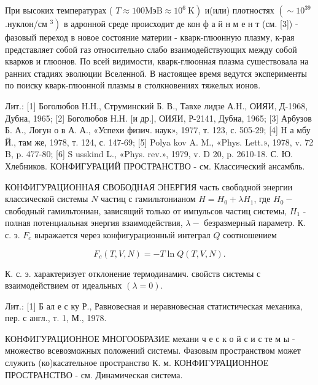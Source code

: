 \documentclass[10pt]{article}
\begin{document}
При высоких температурах ( $\left.T \approx 100 \mathrm{MэB} \approx 10^{6} \mathrm{~K}\right)$ и(или) плотностях $\left(\sim 10^{39}\right.$.нуклон/см $\left.{ }^{3}\right)$ в адронной среде происходит де кон ф а й н м е н т (см. [3]) - фазовый переход в новое состояние материи - кварк-глюонную плазму, к-рая представляет собой газ относительно слабо взаимодействующих между собой кварков и глюонов. По всей видимости, кварк-глюонная плазма сушествовала на ранних стадиях эволюции Вселенной. В настоящее время ведутся эксперименты по поиску кварк-глюонной плазмы в столкновениях тяжелых ионов.



Лит.: [1] Боголюбов Н.Н., Струминский Б. В., Тавхе лидзе А.Н., ОИЯИ, Д-1968, Дубна, 1965; [2] Боголюбов Н.Н. [и др.], ОИЯИ, Р-2141, Дубна, 1965; [3] Арбузов Б. А., Логун о в А. А., «Успехи физич. наук», 1977, т. 123, с. 505-29; [4] Н а мбу Й., там же, 1978, т. 124, с. 147-69; [5] Polya kov A. M., «Phys. Lett.», 1978, v. 72 B, p. 477-80; [6] S usskind L., «Phys. rev.», 1979, v. D 20, p. 2610-18. С. Ю. Хлебников. КОНФИГУРАЦИЙ ПРОСТРАНСТВО - см. Классический ансамбль.



КОНФИГУРАЦИОННАЯ СВОБОДНАЯ ЭНЕРГИЯ часть свободной энергии классической системы $N$ частиц с гамильтонианом $H=H_{0}+\lambda H_{1}$, где $H_{0}-$ свободный гамильтониан, зависящий только от импульсов частиц системы, $H_{1}$ - полная потенциальная энергия взаимодействия, $\lambda-$ безразмерный параметр. К. с. э. $F_{c}$ выражается через конфигурационный интеграл $Q$ соотношением



\[

F_{c}(T, V, N)=-T \ln Q(T, V, N) .

\]



К. с. э. характеризует отклонение термодинамич. свойств системы с взаимодействием от идеальных $(\lambda=0)$.



Лит.: [1] Б ал е с ку Р., Равновесная и неравновесная статистическая механика, пер. с англ., т. 1, М., 1978.



КОНФИГУРАЦИОННОЕ МНОГООБРАЗИЕ механи ч е с к о й с и с те м ы - множество всевозможных положений системы. Фазовым пространством может служить (ко)касательное пространство К. м. КОНФИГУРАЦИОННОЕ ПРОСТРАНСТВО - см. Динамическая система.
\end{document}
